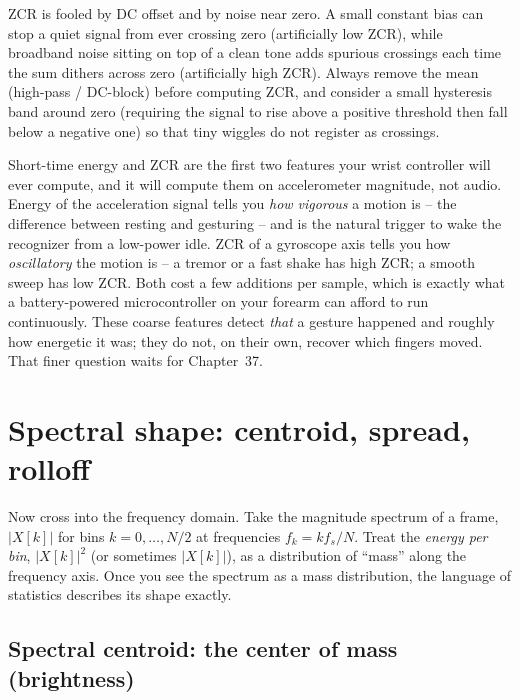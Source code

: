\begin{trapbox}
ZCR is fooled by DC offset and by noise near zero. A small constant bias can stop
a quiet signal from ever crossing zero (artificially low ZCR), while broadband
noise sitting on top of a clean tone adds spurious crossings each time the sum
dithers across zero (artificially high ZCR). Always remove the mean
(high-pass / DC-block) before computing ZCR, and consider a small hysteresis
band around zero (requiring the signal to rise above a positive threshold then fall below a negative one) so that tiny wiggles do not register as crossings.
\end{trapbox}

\begin{goalbox}
Short-time energy and ZCR are the first two features your wrist controller will
ever compute, and it will compute them on accelerometer magnitude, not audio.
Energy of the acceleration signal tells you \emph{how vigorous} a motion is --
the difference between resting and gesturing -- and is the natural trigger to wake
the recognizer from a low-power idle. ZCR of a gyroscope axis tells you how
\emph{oscillatory} the motion is -- a tremor or a fast shake has high ZCR; a
smooth sweep has low ZCR. Both cost a few additions per sample, which is exactly
what a battery-powered microcontroller on your forearm can afford to run
continuously. These coarse features detect \emph{that} a
gesture happened and roughly how energetic it was; they do not, on their own,
recover which fingers moved. That finer question waits for Chapter~37.
\end{goalbox}

\section{Spectral shape: centroid, spread, rolloff}
\label{ch27:spectral-shape}

Now cross into the frequency domain. Take the magnitude spectrum of a frame,
$|X[k]|$ for bins $k = 0, \dots, N/2$ at frequencies $f_k = k f_s / N$. Treat the
\emph{energy per bin}, $|X[k]|^2$ (or sometimes $|X[k]|$), as a distribution of
``mass'' along the frequency axis. Once you see the spectrum as a mass
distribution, the language of statistics describes its shape exactly.

\subsection*{Spectral centroid: the center of mass (brightness)}

